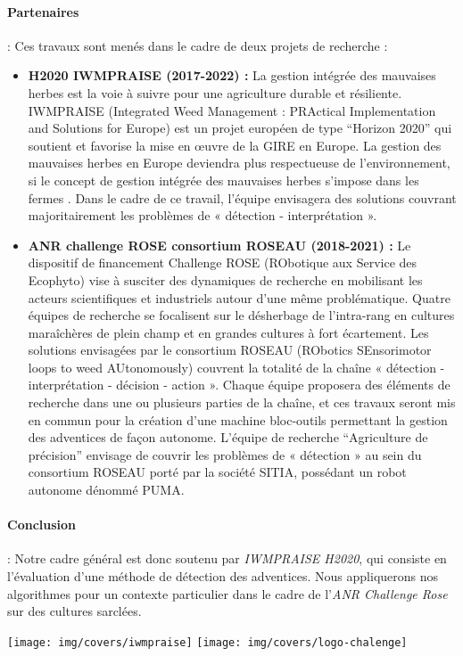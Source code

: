 \documentclass[../thesis.tex]{subfiles}
\begin{document}
    \paragraph{Partenaires} : Ces travaux sont menés dans le cadre de deux projets de recherche :
    
    \begin{itemize}
        \item \textbf{H2020 IWMPRAISE (2017-2022) :} La gestion intégrée des mauvaises herbes est la voie à suivre pour une agriculture durable et résiliente. IWMPRAISE (Integrated Weed Management : PRActical Implementation and Solutions for Europe) est un projet européen de type ``Horizon 2020'' qui soutient et favorise la mise en œuvre de la GIRE en Europe. La gestion des mauvaises herbes en Europe deviendra plus respectueuse de l'environnement, si le concept de gestion intégrée des mauvaises herbes s'impose dans les fermes \cite{Kudsk2020}. Dans le cadre de ce travail, l'équipe envisagera des solutions couvrant majoritairement les problèmes de « détection - interprétation ». \\
        
        \item \textbf{ANR challenge ROSE consortium ROSEAU (2018-2021) :} Le dispositif de financement Challenge ROSE (RObotique aux Service des Ecophyto) vise à susciter des dynamiques de recherche en mobilisant les acteurs scientifiques et industriels autour d'une même problématique. Quatre équipes de recherche se focalisent sur le désherbage de l'intra-rang en cultures maraîchères de plein champ et en grandes cultures à fort écartement. Les solutions envisagées par le consortium ROSEAU (RObotics SEnsorimotor loops to weed AUtonomously) couvrent la totalité de la chaîne « détection - interprétation - décision - action ». Chaque équipe proposera des éléments de recherche dans une ou plusieurs parties de la chaîne, et ces travaux seront mis en commun pour la création d'une machine bloc-outils permettant la gestion des adventices de façon autonome. L'équipe de recherche ``Agriculture de précision'' envisage de couvrir les problèmes de « détection » au sein du consortium ROSEAU porté par la société SITIA, possédant un robot autonome dénommé PUMA. \\
    \end{itemize}
    
    \paragraph{Conclusion} : Notre cadre général est donc soutenu par \textit{IWMPRAISE H2020}, qui consiste en l'évaluation d'une méthode de détection des adventices.
    Nous appliquerons nos algorithmes pour un contexte particulier dans le cadre de l'\textit{ANR Challenge Rose} sur des cultures sarclées.
    
    
    \vfill
    \hfill
    \texttt{[image: img/covers/iwmpraise]}
    \hfill
    \texttt{[image: img/covers/logo-chalenge]}
    \hfill
    \null
\end{document}
